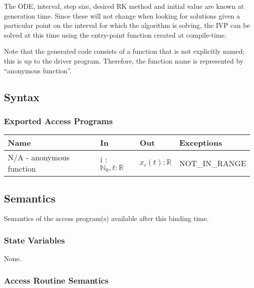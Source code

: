 \documentclass[12pt, titlepage]{article}
\begin{document}
The ODE, interval, step size, desired RK method and initial value are known at 
generation time. 
Since these will not change when looking for solutions given a particular point 
on the interval for which the algorithm is solving, the IVP can be solved at 
this time using the entry-point function created at compile-time.

Note that the generated code consists of a function that is not explicitly 
named; this is up to the driver program. Therefore, the function name is 
represented by ``anonymous function''.
\subsection{Syntax}

\subsubsection{Exported Access Programs}

\begin{center}
  \begin{tabular}{p{5cm} p{3cm} p{3cm} p{3cm}}
    \hline
    \textbf{Name} & \textbf{In} & \textbf{Out} & \textbf{Exceptions} \\
    \hline
    N/A - anonymous function & i : $\mathbb{N}_0, t : \mathbb{R}$ & $ x_i(t) : 
    \mathbb{R}$ & NOT\_IN\_RANGE \\
    \hline
  \end{tabular}
\end{center}

\subsection{Semantics}
Semantics of the access program(s) available after this binding time.

\subsubsection{State Variables}
None.

\subsubsection{Access Routine Semantics}
\end{document}
